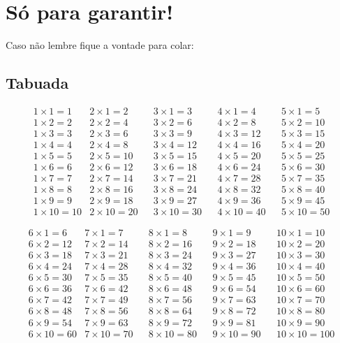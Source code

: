 \chapter{Só para garantir!}
 Caso não lembre fique a vontade para colar:
 \section{Tabuada}

 \begin{align*}
 & 1 \times 1= 1 & 2 \times 1= 2 & & 3 \times 1= 3 & & 4 \times 1= 4 & & 5 \times 1= 5 &\\
 & 1 \times 2= 2 & 2 \times 2= 4 & & 3 \times 2= 6 & & 4 \times 2= 8 & & 5 \times 2= 10 &\\
 & 1 \times 3= 3 & 2 \times 3= 6 & & 3 \times 3= 9 & & 4 \times 3= 12 & & 5 \times 3= 15 &\\
 & 1 \times 4= 4 & 2 \times 4= 8 & & 3 \times 4= 12 & & 4 \times 4= 16 & & 5 \times 4= 20 &\\
 & 1 \times 5= 5 & 2 \times 5= 10 & & 3 \times 5= 15 & & 4 \times 5= 20 & & 5 \times 5= 25 &\\
 & 1 \times 6= 6 & 2 \times 6= 12 & & 3 \times 6= 18 & & 4 \times 6= 24 & & 5 \times 6= 30 &\\
 & 1 \times 7= 7 & 2 \times 7= 14 & & 3 \times 7= 21 & & 4 \times 7= 28 & & 5 \times 7= 35 &\\
 & 1 \times 8= 8 & 2 \times 8= 16 & & 3 \times 8= 24 & & 4 \times 8= 32 & & 5 \times 8= 40 &\\
 & 1 \times 9= 9 & 2 \times 9= 18 & & 3 \times 9= 27 & & 4 \times 9= 36 & & 5 \times 9= 45 &\\
 & 1 \times 10= 10 & 2 \times 10= 20 & & 3 \times 10= 30 & & 4 \times 10= 40 & & 5 \times 10= 50 &
 \end{align*}

 \begin{align*}
 & 6 \times 1= 6 & 7 \times 1= 7 & & 8 \times 1= 8 & & 9 \times 1= 9 & & 10 \times 1= 10 &\\
 & 6 \times 2= 12 & 7 \times 2= 14 & & 8 \times 2= 16 & & 9 \times 2= 18 & & 10 \times 2= 20 &\\
 & 6 \times 3= 18 & 7 \times 3= 21 & & 8 \times 3= 24 & & 9 \times 3= 27 & & 10 \times 3= 30 &\\
 & 6 \times 4= 24 & 7 \times 4= 28 & & 8 \times 4= 32 & & 9 \times 4= 36 & & 10 \times 4= 40 &\\
 & 6 \times 5= 30 & 7 \times 5= 35 & & 8 \times 5= 40 & & 9 \times 5= 45 & & 10 \times 5= 50 &\\
 & 6 \times 6= 36 & 7 \times 6= 42 & & 8 \times 6= 48 & & 9 \times 6= 54 & & 10 \times 6= 60 &\\
 & 6 \times 7= 42 & 7 \times 7= 49 & & 8 \times 7= 56 & & 9 \times 7= 63 & & 10 \times 7= 70 &\\
 & 6 \times 8= 48 & 7 \times 8= 56 & & 8 \times 8= 64 & & 9 \times 8= 72 & & 10 \times 8= 80 &\\
 & 6 \times 9= 54 & 7 \times 9= 63 & & 8 \times 9= 72 & & 9 \times 9= 81 & & 10 \times 9= 90 &\\
 & 6 \times 10= 60 & 7 \times 10= 70 & & 8 \times 10= 80 & & 9 \times 10= 90 & & 10 \times 10= 100 &
 \end{align*}

